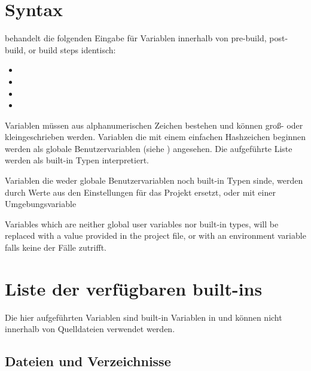 \section{Syntax}

\codeblocks behandelt die folgenden Eingabe für Variablen innerhalb von pre-build, post-build, or build steps identisch:

\begin{itemize}
\item {}
\item {}
\item {}
\item {}
\end{itemize}

Variablen müssen aus alphanumerischen Zeichen bestehen und können groß- oder kleingeschrieben werden. Variablen die mit einem einfachen Hashzeichen \codeline{(#)} beginnen werden als globale Benutzervariablen (siehe ) angesehen. Die aufgeführte Liste werden als built-in Typen interpretiert.

Variablen die weder globale Benutzervariablen noch built-in Typen sinde, werden durch Werte aus den Einstellungen für das Projekt ersetzt, oder mit einer Umgebungsvariable

Variables which are neither global user variables nor built-in types, will be replaced with a value provided in the project file, or with an environment variable falls keine der Fälle zutrifft.


\section{Liste der verfügbaren built-ins}\label{sec:builtin_variables}

Die hier aufgeführten Variablen sind built-in Variablen in \codeblocks und können nicht innerhalb von Quelldateien verwendet werden.

\subsection{Dateien und Verzeichnisse}


